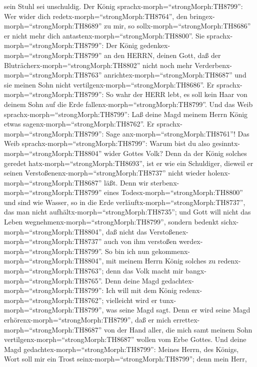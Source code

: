 sein Stuhl sei unschuldig.  Der König
sprachx-morph=``strongMorph:TH8799'': Wer wider dich
redetx-morph=``strongMorph:TH8764'', den
bringex-morph=``strongMorph:TH8689'' zu mir, so
sollx-morph=``strongMorph:TH8686'' er nicht mehr dich
antastenx-morph=``strongMorph:TH8800''.  Sie
sprachx-morph=``strongMorph:TH8799'': Der König
gedenkex-morph=``strongMorph:TH8799'' an den HERRN, deinen Gott, daß der
Bluträcherx-morph=``strongMorph:TH8802'' nicht noch mehr
Verderbenx-morph=``strongMorph:TH8763''
anrichtex-morph=``strongMorph:TH8687'' und sie meinen Sohn nicht
vertilgenx-morph=``strongMorph:TH8686''. Er
sprachx-morph=``strongMorph:TH8799'': So wahr der HERR lebt, es soll
kein Haar von deinem Sohn auf die Erde
fallenx-morph=``strongMorph:TH8799''.  Und das Weib
sprachx-morph=``strongMorph:TH8799'': Laß deine Magd meinem Herrn König
etwas sagenx-morph=``strongMorph:TH8762''. Er
sprachx-morph=``strongMorph:TH8799'': Sage
anx-morph=``strongMorph:TH8761''!  Das Weib
sprachx-morph=``strongMorph:TH8799'': Warum bist du also
gesinntx-morph=``strongMorph:TH8804'' wider Gottes Volk? Denn da der
König solches geredet hatx-morph=``strongMorph:TH8693'', ist er wie ein
Schuldiger, dieweil er seinen Verstoßenenx-morph=``strongMorph:TH8737''
nicht wieder holenx-morph=``strongMorph:TH8687'' läßt. 
Denn wir sterbenx-morph=``strongMorph:TH8799'' eines
Todesx-morph=``strongMorph:TH8800'' und sind wie Wasser, so in die Erde
verläuftx-morph=``strongMorph:TH8737'', das man nicht
aufhältx-morph=``strongMorph:TH8735''; und Gott will nicht das Leben
wegnehmenx-morph=``strongMorph:TH8799'', sondern bedenkt
sichx-morph=``strongMorph:TH8804'', daß nicht das
Verstoßenex-morph=``strongMorph:TH8737'' auch von ihm verstoßen
werdex-morph=``strongMorph:TH8799''.  So bin ich nun
gekommenx-morph=``strongMorph:TH8804'', mit meinem Herrn König solches
zu redenx-morph=``strongMorph:TH8763''; denn das Volk macht mir
bangx-morph=``strongMorph:TH8765''. Denn deine Magd
gedachtex-morph=``strongMorph:TH8799'': Ich will mit dem König
redenx-morph=``strongMorph:TH8762''; vielleicht wird er
tunx-morph=``strongMorph:TH8799'', was seine Magd sagt. 
Denn er wird seine Magd erhörenx-morph=``strongMorph:TH8799'', daß er
mich errettex-morph=``strongMorph:TH8687'' von der Hand aller, die mich
samt meinem Sohn vertilgenx-morph=``strongMorph:TH8687'' wollen vom Erbe
Gottes.  Und deine Magd
gedachtex-morph=``strongMorph:TH8799'': Meines Herrn, des Königs, Wort
soll mir ein Trost seinx-morph=``strongMorph:TH8799''; denn mein Herr,
